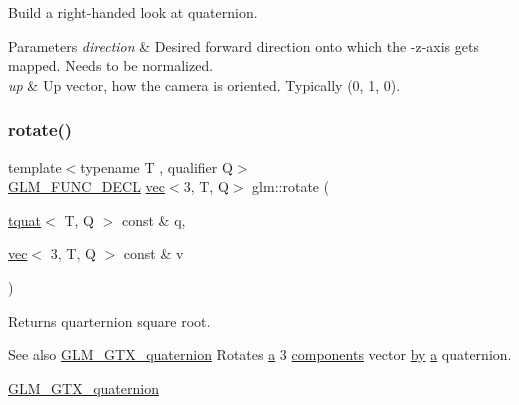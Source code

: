 Build a right-\/handed look at quaternion.


\begin{DoxyParams}{Parameters}
{\em direction} & Desired forward direction onto which the -\/z-\/axis gets mapped. Needs to be normalized. \\
\hline
{\em up} & Up vector, how the camera is oriented. Typically (0, 1, 0). \\
\hline
\end{DoxyParams}
\mbox{\label{group__gtx__quaternion_ga49730f975e7f0ee3862a20b767aba583}} 
\subsubsection{\texorpdfstring{rotate()}{rotate()}\hspace{0.1cm}{\footnotesize\ttfamily [1/2]}}
{\footnotesize\ttfamily template$<$typename T , qualifier Q$>$ \\
\mbox{\hyperlink{setup_8hpp_ab2d052de21a70539923e9bcbf6e83a51}{G\+L\+M\+\_\+\+F\+U\+N\+C\+\_\+\+D\+E\+CL}} \mbox{\hyperlink{structglm_1_1vec}{vec}}$<$3, T, Q$>$ glm\+::rotate (\begin{DoxyParamCaption}\item[{\mbox{\hyperlink{structglm_1_1tquat}{tquat}}$<$ T, Q $>$ const \&}]{q,  }\item[{\mbox{\hyperlink{structglm_1_1vec}{vec}}$<$ 3, T, Q $>$ const \&}]{v }\end{DoxyParamCaption})}

Returns quarternion square root.

\begin{DoxySeeAlso}{See also}
\mbox{\hyperlink{group__gtx__quaternion}{G\+L\+M\+\_\+\+G\+T\+X\+\_\+quaternion}} Rotates \mbox{\hyperlink{_s_d_l__opengl__glext_8h_a3309789fc188587d666cda5ece79cf82}{a}} 3 \mbox{\hyperlink{group__gtx__range_gaf2831875a8cee7cc000abadba2aa1265}{components}} vector \mbox{\hyperlink{_s_d_l__opengl__glext_8h_aee54e9aab2837a54be2ff5fb1c073bd2}{by}} \mbox{\hyperlink{_s_d_l__opengl__glext_8h_a3309789fc188587d666cda5ece79cf82}{a}} quaternion.

\mbox{\hyperlink{group__gtx__quaternion}{G\+L\+M\+\_\+\+G\+T\+X\+\_\+quaternion}} 
\end{DoxySeeAlso}
\mbox{\label{group__gtx__quaternion_ga97a5f8af1d63056b85a53ac28042fe77}} 
